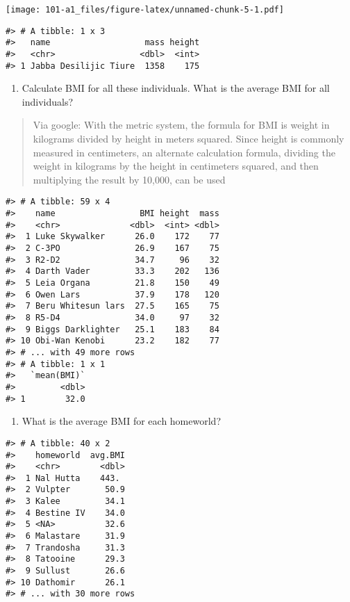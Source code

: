 \documentclass[
]{book}
\providecommand{\tightlist}{%
  \setlength{\itemsep}{0pt}\setlength{\parskip}{0pt}}
\begin{document}
\texttt{[image: 101-a1\_files/figure-latex/unnamed-chunk-5-1.pdf]}

\begin{verbatim}
#> # A tibble: 1 x 3
#>   name                   mass height
#>   <chr>                 <dbl>  <int>
#> 1 Jabba Desilijic Tiure  1358    175
\end{verbatim}

\begin{enumerate}
\def\labelenumi{\arabic{enumi}.}
\setcounter{enumi}{6}
\tightlist
\item
  Calculate BMI for all these individuals. What is the average BMI for all individuals?
\end{enumerate}

\begin{quote}
Via google: With the metric system, the formula for BMI is weight in kilograms divided by height in meters squared. Since height is commonly measured in centimeters, an alternate calculation formula, dividing the weight in kilograms by the height in centimeters squared, and then multiplying the result by 10,000, can be used
\end{quote}

\begin{verbatim}
#> # A tibble: 59 x 4
#>    name                 BMI height  mass
#>    <chr>              <dbl>  <int> <dbl>
#>  1 Luke Skywalker      26.0    172    77
#>  2 C-3PO               26.9    167    75
#>  3 R2-D2               34.7     96    32
#>  4 Darth Vader         33.3    202   136
#>  5 Leia Organa         21.8    150    49
#>  6 Owen Lars           37.9    178   120
#>  7 Beru Whitesun lars  27.5    165    75
#>  8 R5-D4               34.0     97    32
#>  9 Biggs Darklighter   25.1    183    84
#> 10 Obi-Wan Kenobi      23.2    182    77
#> # ... with 49 more rows
#> # A tibble: 1 x 1
#>   `mean(BMI)`
#>         <dbl>
#> 1        32.0
\end{verbatim}

\begin{enumerate}
\def\labelenumi{\arabic{enumi}.}
\setcounter{enumi}{7}
\tightlist
\item
  What is the average BMI for each homeworld?
\end{enumerate}

\begin{verbatim}
#> # A tibble: 40 x 2
#>    homeworld  avg.BMI
#>    <chr>        <dbl>
#>  1 Nal Hutta    443. 
#>  2 Vulpter       50.9
#>  3 Kalee         34.1
#>  4 Bestine IV    34.0
#>  5 <NA>          32.6
#>  6 Malastare     31.9
#>  7 Trandosha     31.3
#>  8 Tatooine      29.3
#>  9 Sullust       26.6
#> 10 Dathomir      26.1
#> # ... with 30 more rows
\end{verbatim}
\end{document}
